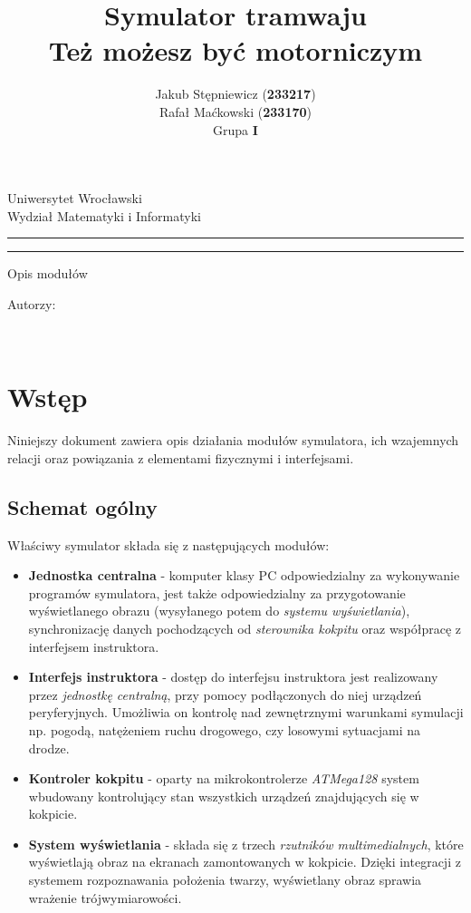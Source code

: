 \documentclass[12pt,a4paper]{article}
\author{Jakub Stępniewicz (\textbf{233217})\\Rafał Maćkowski (\textbf{233170})\\Grupa {\bf I}}
\title{Symulator tramwaju\\ \small{Też możesz być motorniczym}}
\makeatletter
\newcommand{\linia}{\rule{\linewidth}{0.4mm}}
\renewcommand{\maketitle}{\begin{titlepage}
		\vspace*{1cm}
    \begin{center}\small
    	Uniwersytet Wrocławski\\
    	Wydział Matematyki i Informatyki\\
    \end{center}
    \vspace{3cm}
    \noindent
    \linia
    \begin{center}
    	\LARGE{\textsc{\@title}}
         \end{center}
     \linia
    \begin{center}
    	\Large{Opis modułów}
         \end{center}
    \vspace{0.5cm}

    \begin{flushright}

    \begin{minipage}{5.5cm}

    	\small Autorzy:

    \normalsize {\@author} \par
    

    \end{minipage}
    \vspace{5cm}

     

     \end{flushright}

    \vspace*{\stretch{6}}

    \begin{center}

    \@date\\

    \end{center}

  \end{titlepage}%

}
\makeatother
\begin{document}
\maketitle
\tableofcontents
\vspace{5cm}
\newpage
% 

\section{Wstęp}
Niniejszy dokument zawiera opis działania modułów symulatora, ich wzajemnych relacji oraz powiązania z elementami fizycznymi i interfejsami. 

\subsection{Schemat ogólny}
Właściwy symulator składa się z następujących modułów:
\begin{itemize}
\item {\bf Jednostka centralna} - komputer klasy PC odpowiedzialny za wykonywanie programów symulatora,
	jest także odpowiedzialny za przygotowanie wyświetlanego obrazu (wysyłanego potem do {\it
	systemu wyświetlania}), synchronizację danych pochodzących od {\it sterownika kokpitu} oraz
	współpracę z interfejsem instruktora.
\item {\bf Interfejs instruktora} - dostęp do interfejsu instruktora jest realizowany przez {\it jednostkę
	centralną}, przy pomocy podłączonych do niej urządzeń peryferyjnych. Umożliwia on kontrolę nad
	zewnętrznymi warunkami symulacji np. pogodą, natężeniem ruchu drogowego, czy losowymi sytuacjami na
	drodze.
\item {\bf Kontroler kokpitu} - oparty na mikrokontrolerze {\it ATMega128} system wbudowany
	kontrolujący stan wszystkich urządzeń znajdujących się w kokpicie.
\item {\bf System wyświetlania} - składa się z trzech {\it rzutników multimedialnych}, które
	wyświetlają obraz na ekranach zamontowanych w kokpicie. Dzięki integracji z systemem
	rozpoznawania położenia twarzy, wyświetlany obraz sprawia wrażenie trójwymiarowości.
\end{itemize}
\end{document}
